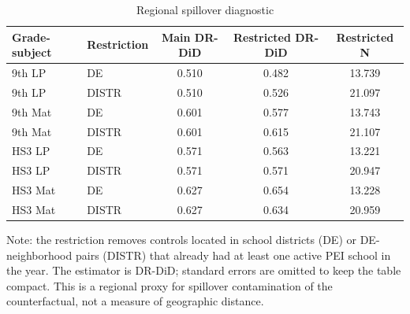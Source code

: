 ﻿\begin{table}[htbp]
\centering
\caption{Regional spillover diagnostic}
\label{tab:spillover_regional}
\begin{tabular}{llccc}
\toprule
Grade-subject & Restriction & Main DR-DiD & Restricted DR-DiD & Restricted N \\
\midrule
9th LP & DE & 0.510 & 0.482 & 13.739 \\
9th LP & DISTR & 0.510 & 0.526 & 21.097 \\
9th Mat & DE & 0.601 & 0.577 & 13.743 \\
9th Mat & DISTR & 0.601 & 0.615 & 21.107 \\
HS3 LP & DE & 0.571 & 0.563 & 13.221 \\
HS3 LP & DISTR & 0.571 & 0.571 & 20.947 \\
HS3 Mat & DE & 0.627 & 0.654 & 13.228 \\
HS3 Mat & DISTR & 0.627 & 0.634 & 20.959 \\
\bottomrule
\end{tabular}
\vspace{0.2cm}
\begin{flushleft}
\footnotesize Note: the restriction removes controls located in school districts (DE) or DE-neighborhood pairs (DISTR) that already had at least one active PEI school in the year. The estimator is DR-DiD; standard errors are omitted to keep the table compact. This is a regional proxy for spillover contamination of the counterfactual, not a measure of geographic distance.
\end{flushleft}
\end{table}



